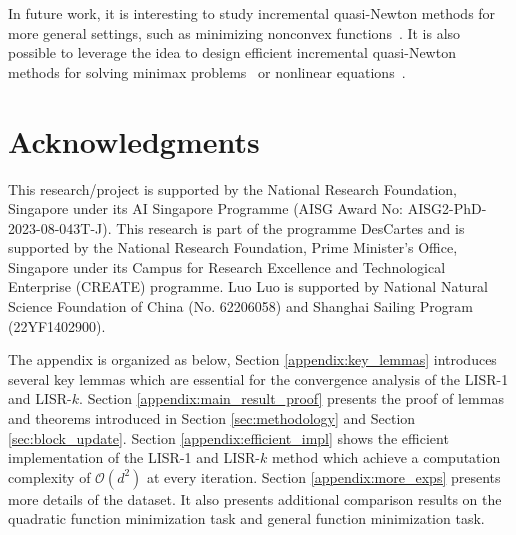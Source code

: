 \documentclass[letterpaper]{article} %
\theoremstyle{plain}
\theoremstyle{definition}
\theoremstyle{remark}
\def\fO{{\mathcal{O}}}
\begin{document}
In future work, it is interesting to study incremental quasi-Newton methods for more general settings, such as minimizing nonconvex functions~\cite{wang2017stochastic,yang2021stochastic}.
It is also possible to leverage the idea to design efficient incremental quasi-Newton methods for solving minimax problems~\cite{liu2022quasi,liu2022partial} or nonlinear equations~\cite{liu2023block}.  


\section*{Acknowledgments}
This research/project is supported by the National Research Foundation, Singapore under its AI Singapore Programme (AISG Award No: AISG2-PhD-2023-08-043T-J).
This research is part of the programme DesCartes and is supported by the National Research Foundation, Prime Minister’s Office, Singapore under its Campus for Research Excellence and Technological Enterprise (CREATE) programme.
Luo Luo is supported by National Natural Science Foundation of China (No. 62206058) and Shanghai Sailing Program (22YF1402900).


\onecolumn

\newpage


The appendix is organized as below,
Section \ref{appendix:key_lemmas} introduces several key lemmas which are essential for the convergence analysis of the LISR-1 and LISR-$k$.
Section \ref{appendix:main_result_proof} presents the proof of lemmas and theorems introduced in Section \ref{sec:methodology} and Section \ref{sec:block_update}.
Section \ref{appendix:efficient_impl} shows the efficient implementation of the LISR-1 and LISR-$k$ method which achieve a computation complexity of $\fO(d^2)$ at every iteration. 
Section \ref{appendix:more_exps} presents more details of the dataset. 
It also presents additional comparison results on the quadratic function minimization task and general function minimization task.
\end{document}

